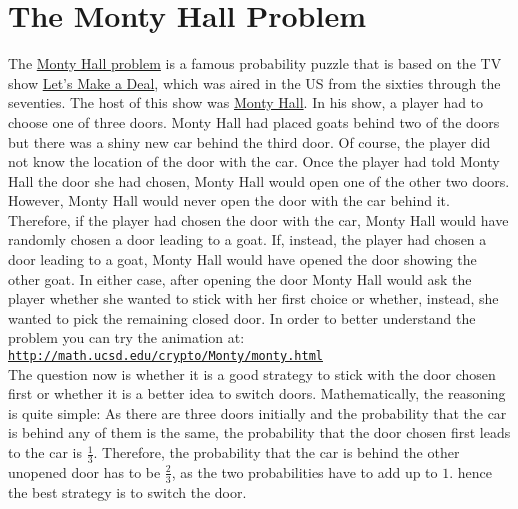 \section{The Monty Hall Problem}
The \href{http://en.wikipedia.org/wiki/Monty_Hall_problem}{Monty Hall problem} is a famous probability
puzzle that is based on the TV show 
\href{http://en.wikipedia.org/wiki/Let%27s_Make_a_Deal}{Let's Make a Deal}, which was aired in the
US from the sixties through the seventies.  The host of this show was 
\href{http://en.wikipedia.org/wiki/Monty_Hall}{Monty Hall}. In his show, a player had to choose one
of three doors.  Monty Hall had placed goats behind two of the doors but there was a shiny new car
behind the third door.  Of course, the player did not know the location of the door with the car.  
Once the player had told Monty Hall the door she had chosen, Monty Hall would open one of the other
two doors.  However, Monty Hall would never open the door with the car behind it.  Therefore, if the
player had chosen the door with the car, Monty Hall would have randomly chosen a door leading to a
goat.  If, instead, the player had chosen a door leading to a goat, Monty Hall would have opened the
door showing the other goat.  In either case, after opening the door  Monty Hall would ask the
player whether she wanted to stick with her first choice or whether, instead, she wanted to pick the
remaining closed door.  In order to better understand the problem you can try the animation at:
\\[0.2cm]
\hspace*{1.3cm}
\href{http://math.ucsd.edu/~crypto/Monty/monty.html}{\texttt{http://math.ucsd.edu/crypto/Monty/monty.html}}
\\[0.2cm]
The question now is whether it is a good strategy to stick with the door chosen first or whether it
is a better idea to switch doors.  Mathematically, the reasoning is quite simple: As there are three doors
initially and the probability that the car is behind any of them is the same, the probability that the
door chosen first leads to the car is $\frac{1}{3}$.  Therefore, the probability that the car is behind
the other unopened door has to be $\frac{2}{3}$, as the two probabilities have to add up to $1$.  hence the
best strategy is to switch the door.


